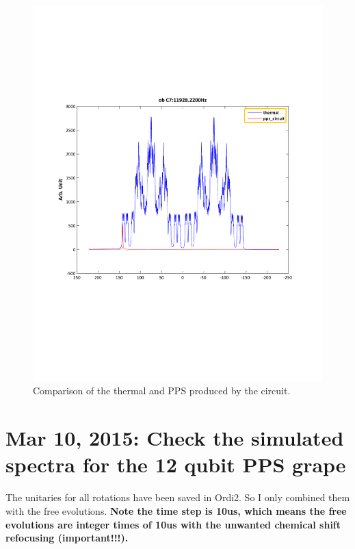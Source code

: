 \documentclass[prl,onecolumn]{revtex4-1}
\begin{document}
\begin{figure}[htb]
\begin{center}
\includegraphics[width=\columnwidth]{thermal_and_pps_circuit.pdf}
\end{center}
\setlength{\abovecaptionskip}{-0.35cm}
\caption{\footnotesize{Comparison of the thermal and PPS produced by the circuit. }}\label{spectra}
\end{figure}

\newpage
\section{Mar 10, 2015: Check the simulated spectra for the 12 qubit PPS grape}

The unitaries for all rotations have been saved in Ordi2. So I only combined them with the free evolutions. \textbf{Note the time step is 10us, which means the free evolutions are integer times of 10us with the unwanted chemical shift refocusing (important!!!).}
\end{document}
